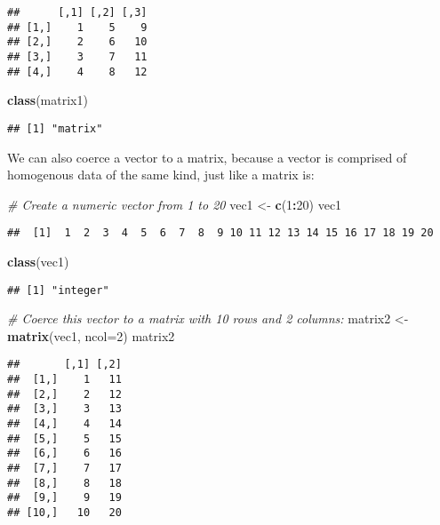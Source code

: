 \documentclass[]{article}
\newenvironment{Shaded}{\begin{snugshade}}{\end{snugshade}}
\newcommand{\KeywordTok}[1]{\textcolor[rgb]{0.13,0.29,0.53}{\textbf{#1}}}
\newcommand{\DataTypeTok}[1]{\textcolor[rgb]{0.13,0.29,0.53}{#1}}
\newcommand{\DecValTok}[1]{\textcolor[rgb]{0.00,0.00,0.81}{#1}}
\newcommand{\StringTok}[1]{\textcolor[rgb]{0.31,0.60,0.02}{#1}}
\newcommand{\CommentTok}[1]{\textcolor[rgb]{0.56,0.35,0.01}{\textit{#1}}}
\newcommand{\OperatorTok}[1]{\textcolor[rgb]{0.81,0.36,0.00}{\textbf{#1}}}
\newcommand{\NormalTok}[1]{#1}
\begin{document}
\begin{verbatim}
##      [,1] [,2] [,3]
## [1,]    1    5    9
## [2,]    2    6   10
## [3,]    3    7   11
## [4,]    4    8   12
\end{verbatim}

\begin{Shaded}
\begin{Highlighting}[]
\KeywordTok{class}\NormalTok{(matrix1)}
\end{Highlighting}
\end{Shaded}

\begin{verbatim}
## [1] "matrix"
\end{verbatim}

We can also coerce a vector to a matrix, because a vector is comprised
of homogenous data of the same kind, just like a matrix is:

\begin{Shaded}
\begin{Highlighting}[]
\CommentTok{# Create a numeric vector from 1 to 20}
\NormalTok{vec1 <-}\StringTok{ }\KeywordTok{c}\NormalTok{(}\DecValTok{1}\OperatorTok{:}\DecValTok{20}\NormalTok{)}
\NormalTok{vec1}
\end{Highlighting}
\end{Shaded}

\begin{verbatim}
##  [1]  1  2  3  4  5  6  7  8  9 10 11 12 13 14 15 16 17 18 19 20
\end{verbatim}

\begin{Shaded}
\begin{Highlighting}[]
\KeywordTok{class}\NormalTok{(vec1)}
\end{Highlighting}
\end{Shaded}

\begin{verbatim}
## [1] "integer"
\end{verbatim}

\begin{Shaded}
\begin{Highlighting}[]
\CommentTok{# Coerce this vector to a matrix with 10 rows and 2 columns:}
\NormalTok{matrix2 <-}\StringTok{ }\KeywordTok{matrix}\NormalTok{(vec1, }\DataTypeTok{ncol=}\DecValTok{2}\NormalTok{)}
\NormalTok{matrix2}
\end{Highlighting}
\end{Shaded}

\begin{verbatim}
##       [,1] [,2]
##  [1,]    1   11
##  [2,]    2   12
##  [3,]    3   13
##  [4,]    4   14
##  [5,]    5   15
##  [6,]    6   16
##  [7,]    7   17
##  [8,]    8   18
##  [9,]    9   19
## [10,]   10   20
\end{verbatim}
\end{document}
